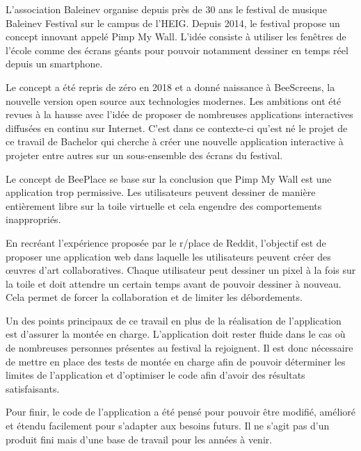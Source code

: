 L'association Baleinev organise depuis près de 30 ans le festival de musique Baleinev Festival sur le campus de l'HEIG.
Depuis 2014, le festival propose un concept innovant appelé Pimp My Wall. L'idée consiste à utiliser les fenêtres de l'école comme des écrans géants pour pouvoir notamment dessiner en temps réel depuis un smartphone.

Le concept a été repris de zéro en 2018 et a donné naissance à BeeScreens, la nouvelle version open source aux technologies modernes. Les ambitions ont été revues à la hausse avec l'idée de proposer de nombreuses applications interactives diffusées en continu sur Internet.
C'est dans ce contexte-ci qu'est né le projet de ce travail de Bachelor qui cherche à créer une
nouvelle application interactive à projeter entre autres sur un sous-ensemble des écrans du festival.

\asterism

Le concept de BeePlace se base sur la conclusion que Pimp My Wall est une application trop permissive. Les utilisateurs peuvent dessiner de manière entièrement libre sur la toile virtuelle et cela engendre des comportements inappropriés.

En recréant l'expérience proposée par le r/place de Reddit, l'objectif est de proposer une application web dans laquelle les utilisateurs peuvent créer des \oe{}uvres d'art collaboratives. Chaque utilisateur peut dessiner un pixel à la fois sur la toile et doit attendre un certain temps avant de pouvoir dessiner à nouveau. Cela permet de forcer la collaboration et de limiter les débordements.

Un des points principaux de ce travail en plus de la réalisation de l'application est d'assurer la montée en charge. L'application doit rester fluide dans le cas où de nombreuses personnes présentes au festival la rejoignent. Il est donc nécessaire de mettre en place des tests de montée en charge afin de pouvoir déterminer les limites de l'application et d'optimiser le code afin d'avoir des résultats satisfaisants.

Pour finir, le code de l'application a été pensé pour pouvoir être modifié, amélioré et étendu facilement pour s'adapter aux besoins futurs. Il ne s'agit pas d'un produit fini mais d'une base de travail pour les années à venir.
